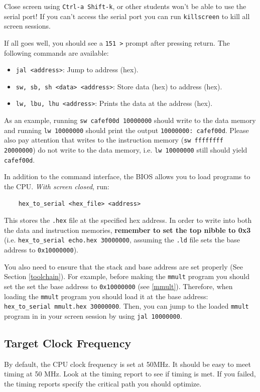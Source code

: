 \documentclass[11pt]{article}
\begin{document}
Close screen using \verb|Ctrl-a Shift-k|, or other students won't be able to use the serial port!
If you can't access the serial port you can run \verb|killscreen| to kill all screen sessions.

If all goes well, you should see a \verb|151 >| prompt after pressing return. The following commands are available:
\begin{itemize}
    \item \verb|jal <address>|: Jump to address (hex).
    \item \verb|sw, sb, sh <data> <address>|: Store data (hex) to address (hex).
    \item \verb|lw, lbu, lhu <address>|: Prints the data at the address (hex).
\end{itemize}

As an example, running \verb|sw cafef00d 10000000| should write to the data memory and running \verb|lw 10000000| should print the output \verb|10000000: cafef00d|.
Please also pay attention that writes to the instruction memory (\verb|sw ffffffff 20000000|) do not write to the data memory, i.e. \verb|lw 10000000| still should yield \verb|cafef00d|.

In addition to the command interface, the BIOS allows you to load programs to the CPU. \textit{With screen closed}, run:
\begin{verbatim}
    hex_to_serial <hex_file> <address>
\end{verbatim}

This stores the \verb|.hex| file at the specified hex address.
In order to write into both the data and instruction memories, \textbf{remember to set the top nibble to 0x3} (i.e. \verb|hex_to_serial echo.hex 30000000|, assuming the \verb|.ld| file sets the base address to \verb|0x10000000|).

You also need to ensure that the stack and base address are set properly (See Section \ref{toolchain}).
For example, before making the \verb|mmult| program you should set the set the base address to \verb|0x10000000| (see \ref{mmult}).
Therefore, when loading the \verb|mmult| program you should load it at the base address: \verb|hex_to_serial mmult.hex 30000000|.
Then, you can jump to the loaded \verb|mmult| program in in your screen session by using \verb|jal 10000000|.

\subsection{Target Clock Frequency}
By default, the CPU clock frequency is set at 50MHz.
It should be easy to meet timing at 50 MHz.
Look at the timing report to see if timing is met.
If you failed, the timing reports specify the critical path you should optimize.
\end{document}
